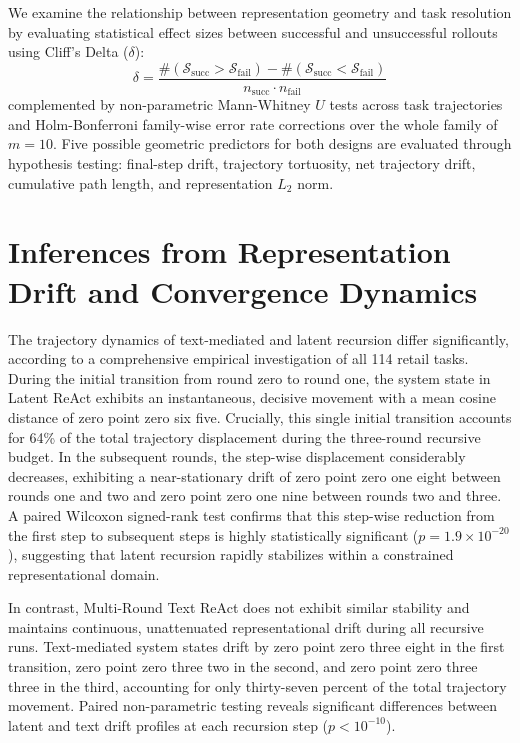 \documentclass[a4paper, 12pt]{report}
\begin{document}
We examine the relationship between representation geometry and task resolution by evaluating statistical effect sizes between successful and unsuccessful rollouts using Cliff's Delta ($\delta$):
\begin{equation}
    \delta = \frac{\#(\mathcal{S}_{\text{succ}} > \mathcal{S}_{\text{fail}}) - \#(\mathcal{S}_{\text{succ}} < \mathcal{S}_{\text{fail}})}{n_{\text{succ}} \cdot n_{\text{fail}}}
\end{equation}
complemented by non-parametric Mann-Whitney $U$ tests across task trajectories and Holm-Bonferroni family-wise error rate corrections over the whole family of $m = 10$. Five possible geometric predictors for both designs are evaluated through hypothesis testing: final-step drift, trajectory tortuosity, net trajectory drift, cumulative path length, and representation $L_2$ norm.

\section{Inferences from Representation Drift and Convergence Dynamics}
The trajectory dynamics of text-mediated and latent recursion differ significantly, according to a comprehensive empirical investigation of all 114 retail tasks. During the initial transition from round zero to round one, the system state in Latent ReAct exhibits an instantaneous, decisive movement with a mean cosine distance of zero point zero six five. Crucially, this single initial transition accounts for 64\% of the total trajectory displacement during the three-round recursive budget. In the subsequent rounds, the step-wise displacement considerably decreases, exhibiting a near-stationary drift of zero point zero one eight between rounds one and two and zero point zero one nine between rounds two and three. A paired Wilcoxon signed-rank test confirms that this step-wise reduction from the first step to subsequent steps is highly statistically significant ($p = 1.9 \times 10^{-20}$), suggesting that latent recursion rapidly stabilizes within a constrained representational domain.

In contrast, Multi-Round Text ReAct does not exhibit similar stability and maintains continuous, unattenuated representational drift during all recursive runs. Text-mediated system states drift by zero point zero three eight in the first transition, zero point zero three two in the second, and zero point zero three three in the third, accounting for only thirty-seven percent of the total trajectory movement. Paired non-parametric testing reveals significant differences between latent and text drift profiles at each recursion step ($p < 10^{-10}$).
\end{document}
